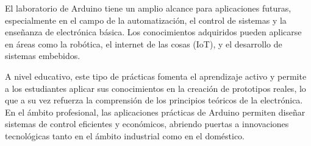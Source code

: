 El laboratorio de Arduino tiene un amplio alcance para aplicaciones futuras, especialmente en el campo de la automatización, el control de sistemas y la enseñanza de electrónica básica. Los conocimientos adquiridos pueden aplicarse en áreas como la robótica, el internet de las cosas (IoT), y el desarrollo de sistemas embebidos.

A nivel educativo, este tipo de prácticas fomenta el aprendizaje activo y permite a los estudiantes aplicar sus conocimientos en la creación de prototipos reales, lo que a su vez refuerza la comprensión de los principios teóricos de la electrónica. En el ámbito profesional, las aplicaciones prácticas de Arduino permiten diseñar sistemas de control eficientes y económicos, abriendo puertas a innovaciones tecnológicas tanto en el ámbito industrial como en el doméstico.